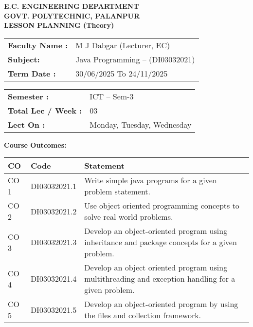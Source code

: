 \documentclass[12pt]{article}
\begin{document}
\begin{center}
\textbf{\large E.C. ENGINEERING DEPARTMENT}\\
\textbf{\large GOVT. POLYTECHNIC, PALANPUR}\\
\vspace{0.2cm}
\textbf{\large LESSON PLANNING (Theory)}
\end{center}

\vspace{0.3cm}

\begin{tabular}{ll}
\textbf{Faculty Name :} & M J Dabgar (Lecturer, EC) \\
\textbf{Subject:} & Java Programming – (DI03032021) \\
\textbf{Term Date :} & 30/06/2025 To 24/11/2025 \\
\end{tabular}
\hfill
\begin{tabular}{ll}
\textbf{Semester :} & ICT – Sem-3 \\
\textbf{Total Lec / Week :} & 03 \\
\textbf{Lect On :} & Monday, Tuesday, Wednesday \\
\end{tabular}

\vspace{0.3cm}

\textbf{Course Outcomes:}

\begin{longtable}{|p{1cm}|p{3cm}|p{11cm}|}
\hline
\textbf{CO} & \textbf{Code} & \textbf{Statement} \\
\hline
CO 1 & DI03032021.1 & Write simple java programs for a given problem statement. \\\hline
CO 2 & DI03032021.2 & Use object oriented programming concepts to solve real world problems. \\\hline
CO 3 & DI03032021.3 & Develop an object-oriented program using inheritance and package concepts for a given problem. \\\hline
CO 4 & DI03032021.4 & Develop an object oriented program using multithreading and exception handling for a given problem. \\\hline
CO 5 & DI03032021.5 & Develop an object-oriented program by using the files and collection framework. \\\hline
\end{longtable}

\vspace{0.3cm}
\end{document}

